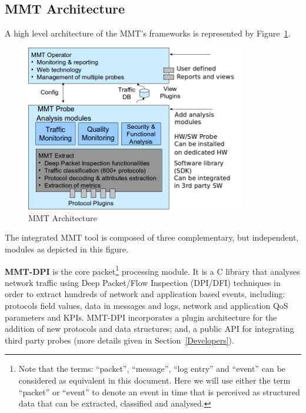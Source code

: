 \subsection{MMT Architecture}
 
 A high level architecture of the {MMT}{\textquoteright}s frameworks is represented by Figure~\ref{archi}.

\begin{figure}[H]
\centering
\includegraphics[width=3.8in]{img/archi.png}
\caption{MMT Architecture}\label{archi}
\end{figure}

The integrated {MMT} tool is composed of three complementary, but independent, modules as depicted in this figure.

\textbf{MMT-DPI} is the core packet\footnote{Note that the terms: {\textquotedblleft}packet{\textquotedblright}, {\textquotedblleft}message{\textquotedblright}, {\textquotedblleft}log entry{\textquotedblright} and {\textquotedblleft}event{\textquotedblright} can be considered as equivalent in this document. Here we will use either the term {\textquotedblleft}packet{\textquotedblright} or {\textquotedblleft}event{\textquotedblright} to denote an event in time that is perceived as structured data that can be extracted, classified and analysed.} processing module. It is a C library that analyses network traffic using Deep Packet/Flow Inspection (DPI/DFI) techniques in order to extract hundreds of network and application based events, including: protocols field values, data in messages and logs, network and application QoS parameters and KPIs. MMT-DPI incorporates a plugin architecture for the addition of new protocols and data structures; and, a public API for integrating third party probes (more details given in Section~\ref{Developers}).

